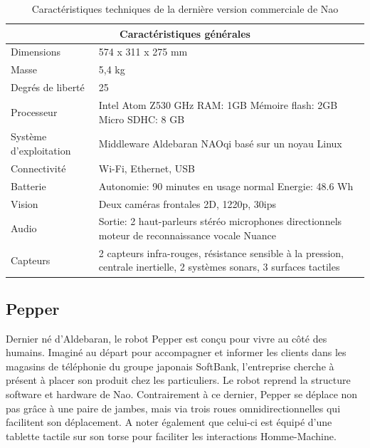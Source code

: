 \begin{table}[H]
	\begin{tabular}{ | l | p{10cm} | }
	\hline
	\multicolumn{2}{|c|}{Caractéristiques générales} \\
	\hline
	Dimensions & 574 x 311 x 275 mm \\
	\hline 
	Masse & 5,4 kg \\
	\hline 
	Degrés de liberté  & 25 \\
	\hline
	Processeur & Intel Atom Z530 \newline 1.6 GHz \newline RAM: 1GB \newline Mémoire flash: 2GB  \newline Micro SDHC: 8 GB \\
	\hline
	Système d'exploitation & Middleware Aldebaran NAOqi basé sur un noyau Linux \\
	\hline
	Connectivité & Wi-Fi, Ethernet, USB \\
	\hline
	Batterie & Autonomie: 90 minutes en usage normal \newline Energie: 48.6 Wh \\
	\hline 
	Vision & Deux caméras frontales 2D, 1220p, 30ips \\
	\hline
	Audio & Sortie: 2 haut-parleurs stéréo \newline 4 microphones directionnels \newline moteur de reconnaissance vocale Nuance  \\
	\hline
	Capteurs & 2 capteurs infra-rouges, résistance sensible à la pression, centrale inertielle, 2 systèmes sonars, 3 surfaces tactiles \\
	\hline
	\end{tabular}
\caption[Caractéristiques techniques de Nao]{Caractéristiques techniques de la dernière version commerciale  de Nao}
\label {tab: Caractéristiques techniques de Nao}
\cite{NaoTech}
\end{table}

\subsection{Pepper}
\label{Entreprise: Les produits: Pepper}
Dernier né d'Aldebaran, le robot Pepper est conçu pour vivre au côté des humains. Imaginé au départ pour accompagner et informer les clients dans les magasins de téléphonie du groupe japonais SoftBank, l'entreprise cherche à présent à placer son produit chez les particuliers. Le robot reprend la structure software et hardware de Nao. Contrairement à ce dernier, Pepper se déplace non pas grâce à une paire de jambes, mais via trois roues omnidirectionnelles qui facilitent son déplacement. A noter également que celui-ci est équipé d'une tablette tactile sur son torse pour faciliter les interactions Homme-Machine.

